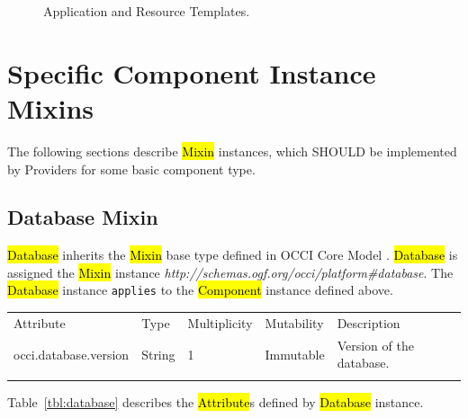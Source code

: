 \documentclass[10pt,a4paper]{article}
\begin{document}
\begin{figure}[!h]
	{\centering {} \par}
	\caption{Application and Resource Templates.}
	\label{fig:templates}
\end{figure}

\section{Specific Component Instance Mixins}
The following sections describe \hl{Mixin} instances, which SHOULD be implemented by Providers for some basic component type.

\subsection{Database Mixin}

\hl{Database} inherits the \hl{Mixin} base type defined in OCCI Core Model \cite{occi:core}. \hl{Database} is assigned the \hl{Mixin} instance \textit{http://schemas.ogf.org/occi/platform\#database}. The \hl{Database} instance \texttt{applies} to the \hl{Component} instance defined above.

{
	\begin{tabular}{lp{2.5cm}p{1cm}lp{5cm}}
	\toprule
	Attribute&Type&Multi\-plicity&Mutability&Description\\
	\colrule
	occi.database.version & String & 1 & Immutable & Version of the database.\\
	\botrule
	\end{tabular}
}

Table~\ref{tbl:database} describes the \hl{Attribute}s defined by \hl{Database} instance.
\end{document}
